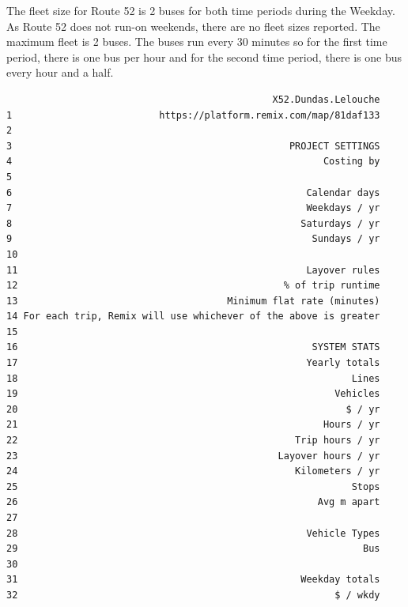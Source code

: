 \documentclass[
11pt, %
oneside, %
english, %
singlespacing, %
]{macthesis} %
\begin{document}
The fleet size for Route 52 is 2 buses for both time periods during the Weekday. As Route 52 does not run-on weekends, there are no fleet sizes reported. The maximum fleet is 2 buses. The buses run every 30 minutes so for the first time period, there is one bus per hour and for the second time period, there is one bus every hour and a half.
\begin{verbatim}
                                               X52.Dundas.Lelouche
1                          https://platform.remix.com/map/81daf133
2                                                                 
3                                                 PROJECT SETTINGS
4                                                       Costing by
5                                                                 
6                                                    Calendar days
7                                                    Weekdays / yr
8                                                   Saturdays / yr
9                                                     Sundays / yr
10                                                                
11                                                   Layover rules
12                                               % of trip runtime
13                                     Minimum flat rate (minutes)
14 For each trip, Remix will use whichever of the above is greater
15                                                                
16                                                    SYSTEM STATS
17                                                   Yearly totals
18                                                           Lines
19                                                        Vehicles
20                                                          $ / yr
21                                                      Hours / yr
22                                                 Trip hours / yr
23                                              Layover hours / yr
24                                                 Kilometers / yr
25                                                           Stops
26                                                     Avg m apart
27                                                                
28                                                   Vehicle Types
29                                                             Bus
30                                                                
31                                                  Weekday totals
32                                                        $ / wkdy

\end{verbatim}
\end{document}

